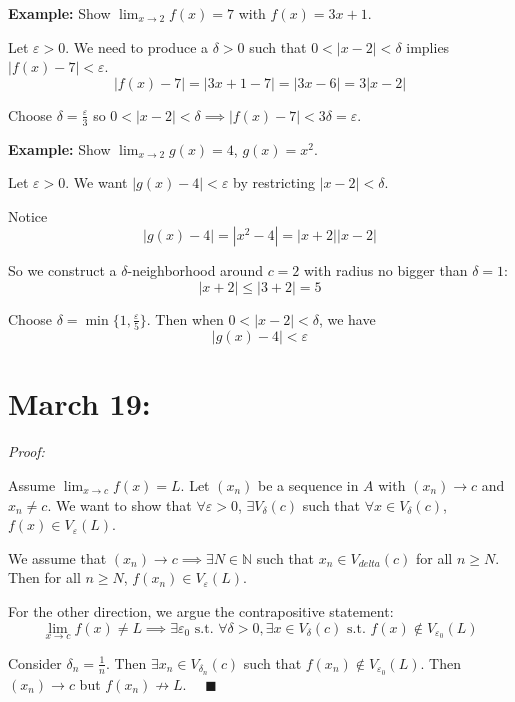 \documentclass[12pt]{report}
\newcommand{\R}{\mathbb{R}}
\newcommand{\N}{\mathbb{N}}
\newcommand{\qed}{\quad \blacksquare}
\newcommand{\abs}[1]{\left\vert #1 \right\vert}
\newcommand{\st}{\text{ s.t. }}
\newcommand{\ep}{\varepsilon}
\newenvironment*{tbox}[2][gray]{
    \begin{tcolorbox}[
        parbox=false,
        colback=#1!5!white,
        colframe=#1!75!black,
        breakable,
        title={#2}
    ]}
    {\end{tcolorbox}}
\begin{document}
    \textbf{Example:} Show $\lim_{x \to 2} f(x) = 7$ with $f(x) = 3x + 1$. 

    Let $\ep > 0$. We need to produce a $\delta > 0$ such that $0 < \abs{x - 2} < \delta$ implies $\abs{f(x) - 7} < \ep$. 
    \[\abs{f(x) - 7} = \abs{3x + 1 - 7} = \abs{3x - 6} = 3\abs{x - 2}\]

    Choose $\delta = \frac{\ep}{3}$ so $0 < \abs{x - 2} < \delta \implies \abs{f(x) - 7} < 3\delta = \ep$.

    \textbf{Example:} Show $\lim_{x\to 2} g(x) = 4$, $g(x) = x^2$. 

    Let $\ep > 0$. We want $\abs{g(x) - 4} < \ep$ by restricting $\abs{x - 2} < \delta$. 

    Notice
    \[\abs{g(x) - 4} = \abs{x^2 - 4} = \abs{x + 2}\abs{x - 2}\] 

    So we construct a $\delta$-neighborhood around $c = 2$ with radius no bigger than $\delta = 1$: 
    \[\abs{x + 2} \leq \abs{3 + 2} = 5\] 

    Choose $\delta = \min\{1, \frac{\ep}{5}\}$. Then when $0 < \abs{x - 2} < \delta$, we have 
    \[\abs{g(x) -4} < \ep\]

\section{March 19:}
    \begin{tbox}{\textbf{Theorem (Sequential Criterion for Functional Limits):} Given $f: A \to \R$ and $c$ is a limit point of $A$, then the following are equivalent:
        \begin{enumerate}
            \item $\lim_{x\to c} f(x) = L$
            \item For every sequence $(x_n)$ in $A$ with $(x_n) \to c$ and $x_n \neq c$, we have $f(x_n) \to L$
        \end{enumerate} }
        \emph{Proof:} 

        Assume $\lim_{x\to c} f(x) = L$. Let $(x_n)$ be a sequence in $A$ with $(x_n) \to c$ and $x_n \neq c$. We want to show that $\forall \ep >0$, $\exists V_{\delta}(c)$ such that $\forall x \in V_{\delta}(c)$, $f(x) \in V_{\ep}(L)$. 

        We assume that $(x_n) \to c \implies \exists N \in \N$ such that $x_n \in V_{delta}(c)$ for all $n \geq N$. Then for all $n \geq N$, $f(x_n) \in V_{\ep}(L)$.
        
        For the other direction, we argue the contrapositive statement: 
        \[\lim_{x \to c} f(x) \neq L \implies \exists \ep_0 \st \forall \delta > 0, \exists x \in V_{\delta}(c) \st f(x) \notin V_{\ep_0}(L)\]

        Consider $\delta_n = \frac{1}{n}$. Then $\exists x_n \in V_{\delta_n}(c)$ such that $f(x_n) \notin V_{\ep_0}(L)$. Then $(x_n) \to c$ but $f(x_n) \nrightarrow L$. $\qed$
    \end{tbox}
\end{document}
